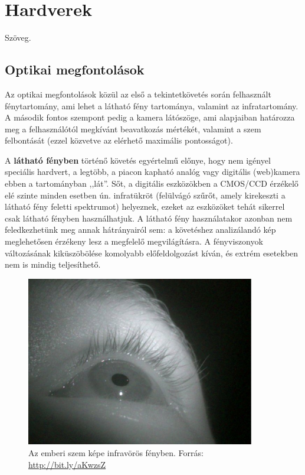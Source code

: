 \chapter{Hardverek}\label{sect:hardver}

Szöveg.

\section{Optikai megfontolások}\label{sect:hw_optikai}

Az optikai megfontolások közül az első a tekintetkövetés során felhasznált fénytartomány, ami lehet a látható fény tartománya, valamint az infratartomány. A második fontos szempont pedig a kamera látószöge, ami alapjaiban határozza meg a felhasználótól megkívánt beavatkozás mértékét, valamint a szem felbontását (ezzel közvetve az elérhető maximális pontosságot).

\bigskip

A \textbf{látható fényben} történő követés egyértelmű előnye, hogy nem igényel speciális hardvert, a legtöbb, a piacon kapható analóg vagy digitális (web)kamera ebben a tartományban ,,lát''. Sőt, a digitális eszközökben a CMOS/CCD érzékelő elé szinte minden esetben ún. infratükröt (felülvágó szűrőt, amely kirekeszti a látható fény feletti spektrumot) helyeznek, ezeket az eszközöket tehát sikerrel csak látható fényben használhatjuk. A látható fény használatakor azonban nem feledkezhetünk meg annak hátrányairól sem: a követéshez analizálandó kép meglehetősen érzékeny lesz a megfelelő megvilágításra. A fényviszonyok változásának kiküszöbölése komolyabb előfeldolgozást kíván, és extrém esetekben nem is mindig teljesíthető.

\begin{figure}[!ht]
\centering
\includegraphics[width=100mm, keepaspectratio]{figures/infra_eye.png}
\caption{Az emberi szem képe infravörös fényben. Forrás: \url{http://bit.ly/aKwzsZ}}
\label{fig:eyepic}
\end{figure}

